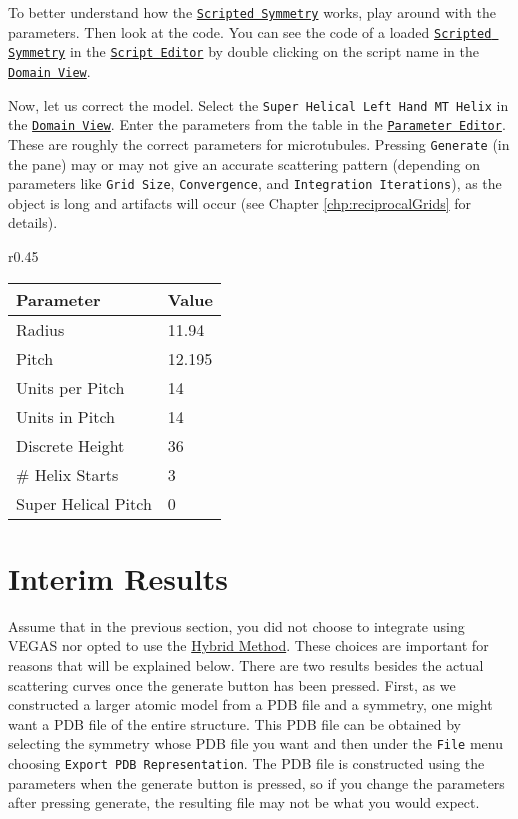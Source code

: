 \documentclass[../D+Manual.tex]{subfiles}
\begin{document}
To better understand how the \hyperref [sec:ScriptedSymmetry]{\texttt{Scripted Symmetry}} works, play around with the parameters. Then look at the code.
You can see the code of a loaded 
\hyperref [sec:ScriptedSymmetry]{\texttt{Scripted Symmetry}} in the \hyperref [sec:symmetryEditor] {\texttt{Script Editor}} by double clicking on the script name in the \hyperref[sec:domainView]{\texttt{Domain View}}.

Now, let us correct the model. Select the \texttt{Super Helical Left Hand MT Helix} in the \hyperref[sec:domainView]{\texttt{Domain View}}. Enter the parameters from the table in the \hyperref[sec:parameterEditor]{\texttt{Parameter Editor}}. These are roughly the correct parameters for microtubules. Pressing \texttt{Generate} (in the \hyperref[sec:controls]{} pane) may or may not give an accurate scattering pattern (depending on parameters like \texttt{Grid Size}, \texttt{Convergence}, and \texttt{Integration Iterations}), as the object is long and artifacts will occur (see Chapter \ref{chp:reciprocalGrids} for details).
 
\begin{wraptable}{r}{0.45\textwidth}
	\vspace{-20pt}
	\centering
	\begin{tabularx}{0.95\linewidth}{X l}
		\toprule
		\textbf{Parameter} & \textbf{Value}\\
		\midrule
		Radius & 11.94 \\
		Pitch & 12.195 \\
		Units per Pitch & 14 \\
		Units in Pitch & 14 \\
		Discrete Height & 36 \\
		\# Helix Starts & 3 \\
		Super Helical Pitch & 0 \\
		\bottomrule
	\end{tabularx}
\end{wraptable}

\section{Interim Results}\label{sec:IntRes}
Assume that in the previous section, you did not choose to integrate using VEGAS nor opted to use the \hyperref[sec:UsingHybridMethod]{Hybrid Method}.
These choices are important for reasons that will be explained below.
There are two results besides the actual scattering curves once the generate button has been pressed.
First, as we constructed a larger atomic model from a PDB file and a symmetry, one might want a PDB file of the entire structure.
This PDB file can be obtained by selecting the symmetry whose PDB file you want and then under the \texttt{File} menu choosing \texttt{Export PDB Representation}.
The PDB file is constructed using the parameters when the generate button is pressed, so if you change the parameters after pressing generate, the resulting file may not be what you would expect.
\end{document}
